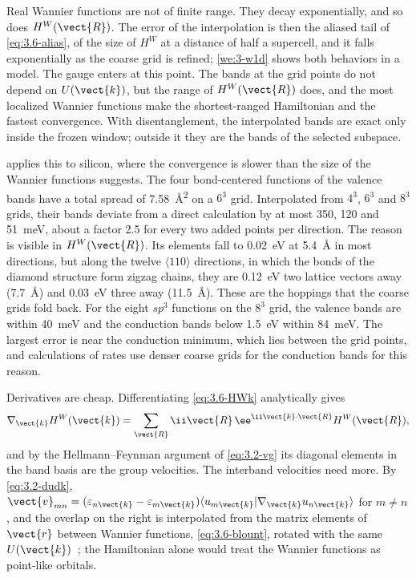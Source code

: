 Real Wannier functions are not of finite range. They decay exponentially, and so does $H^W(\vect{R})$. The error of the interpolation is then the aliased tail of \cref{eq:3.6-alias}, of the size of $H^W$ at a distance of half a supercell, and it falls exponentially as the coarse grid is refined; \cref{we:3-w1d} shows both behaviors in a model. The gauge enters at this point. The bands at the grid points do not depend on $U(\vect{k})$, but the range of $H^W(\vect{R})$ does, and the most localized Wannier functions make the shortest-ranged Hamiltonian and the fastest convergence. With disentanglement, the interpolated bands are exact only inside the frozen window; outside it they are the bands of the selected subspace.

 applies this to silicon, where the convergence is slower than the size of the Wannier functions suggests. The four bond-centered functions of the valence bands have a total spread of \SI{7.58}{\angstrom^2} on a $6^3$ grid. Interpolated from $4^3$, $6^3$ and $8^3$ grids, their bands deviate from a direct calculation by at most 350, 120 and \SI{51}{meV}, about a factor 2.5 for every two added points per direction. The reason is visible in $H^W(\vect{R})$. Its elements fall to \SI{0.02}{eV} at \SI{5.4}{\angstrom} in most directions, but along the twelve $\langle110\rangle$ directions, in which the bonds of the diamond structure form zigzag chains, they are \SI{0.12}{eV} two lattice vectors away (\SI{7.7}{\angstrom}) and \SI{0.03}{eV} three away (\SI{11.5}{\angstrom}). These are the hoppings that the coarse grids fold back. For the eight $sp^3$ functions on the $8^3$ grid, the valence bands are within \SI{40}{meV} and the conduction bands below \SI{1.5}{eV} within \SI{84}{meV}. The largest error is near the conduction minimum, which lies between the grid points, and calculations of rates use denser coarse grids for the conduction bands for this reason.

Derivatives are cheap. Differentiating \cref{eq:3.6-HWk} analytically gives
\begin{equation*}
  \nabla_{\vect{k}}H^W(\vect{k}) = \sum_{\vect{R}}\ii\vect{R}\,\ee^{\ii\vect{k}\cdot\vect{R}}H^W(\vect{R}) ,
\end{equation*}
and by the Hellmann--Feynman argument of \cref{eq:3.2-vg} its diagonal elements in the band basis are the group velocities. The interband velocities need more. By \cref{eq:3.2-dudk}, $\vect{v}_{mn} = (\varepsilon_{n\vect{k}} - \varepsilon_{m\vect{k}})\langle u_{m\vect{k}}|\nabla_{\vect{k}}u_{n\vect{k}}\rangle$ for $m \ne n$, and the overlap on the right is interpolated from the matrix elements of $\vect{r}$ between Wannier functions, \cref{eq:3.6-blount}, rotated with the same $U(\vect{k})$~\cite[Eqs.~(106)--(109)]{marzari2012maximally}; the Hamiltonian alone would treat the Wannier functions as point-like orbitals.


